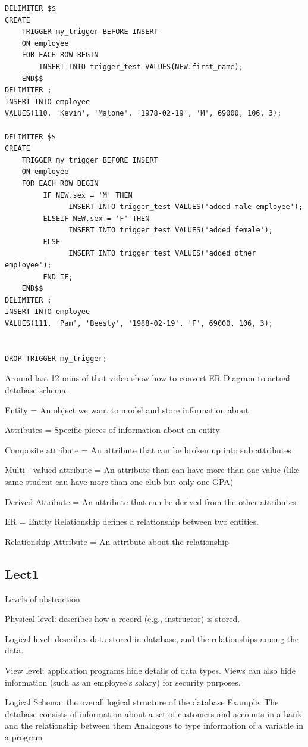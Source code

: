 \documentclass[8pt, a4paper, oneside, twocolumn]{extarticle}
\begin{document}
\begin{verbatim}
DELIMITER $$
CREATE
    TRIGGER my_trigger BEFORE INSERT
    ON employee
    FOR EACH ROW BEGIN
        INSERT INTO trigger_test VALUES(NEW.first_name);
    END$$
DELIMITER ;
INSERT INTO employee
VALUES(110, 'Kevin', 'Malone', '1978-02-19', 'M', 69000, 106, 3);

DELIMITER $$
CREATE
    TRIGGER my_trigger BEFORE INSERT
    ON employee
    FOR EACH ROW BEGIN 
         IF NEW.sex = 'M' THEN
               INSERT INTO trigger_test VALUES('added male employee');
         ELSEIF NEW.sex = 'F' THEN
               INSERT INTO trigger_test VALUES('added female');
         ELSE
               INSERT INTO trigger_test VALUES('added other employee');
         END IF;
    END$$
DELIMITER ;
INSERT INTO employee
VALUES(111, 'Pam', 'Beesly', '1988-02-19', 'F', 69000, 106, 3);


DROP TRIGGER my_trigger;
\end{verbatim}
Around last 12 mins of that video show how to convert ER Diagram to actual database schema.

Entity = An object we want to model and store information about

Attributes = Specific pieces of information about an entity

Composite attribute = An attribute that can be broken up into sub attributes

Multi - valued attribute = An attribute than can have more than one value (like same student can have more than one club but only one GPA)

Derived Attribute = An attribute that can be derived from the other attributes.

ER = Entity Relationship defines a relationship between two entities.

Relationship Attribute = An attribute about the relationship

\subsection{Lect1}
Levels of abstraction

Physical level: describes how a record (e.g., instructor) is stored.

Logical level: describes data stored in database, and the relationships among 
the data.

View level: application programs hide details of data types.  Views can also 
hide information (such as an employee’s salary) for security purposes. 

Logical Schema: the overall logical structure of the database 
Example: The database consists of information about a set of customers and 
accounts in a bank and the relationship between them
Analogous to type information of a variable in a program
\end{document}
